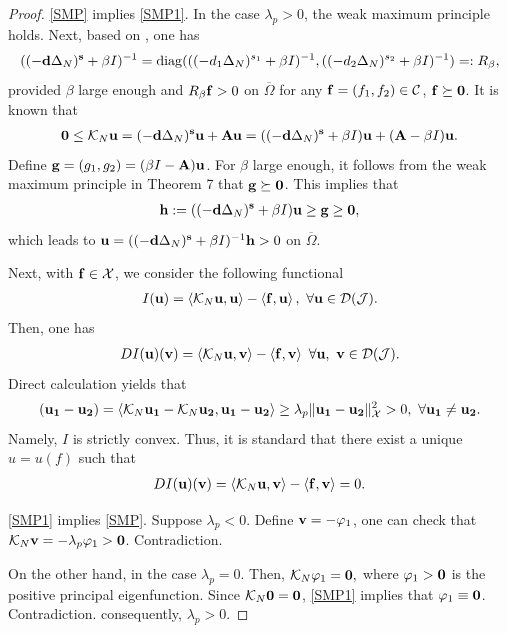 \documentclass[a4paper,11pt]{amsart}
\theoremstyle{definition}
\def\O{\Omega}
\numberwithin{equation}{section}
\theoremstyle{definition}
\def\O{\Omega}
\begin{document}
\begin{proof}  \ref{SMP} implies \ref{SMP1}. In the case $\lambda_p>0$, the weak maximum principle holds. Next, based on \cite[Theorem 3.1, Step 3, Case 1]{zhao_spatiotemporal_2025},   one has
\begin{align*}
((-{\bf d}\Delta_N)^{\bf s}+\beta I)^{-1}=\mathrm{diag}(((-d_1\Delta_N)^{s_1}+\beta I)^{-1},((-d_2\Delta_N)^{s_2}+\beta I)^{-1}) =:R_\beta, 
\end{align*}
provided $\beta$ large enough and $R_\beta{\bf f}>0$ on $\overline{\O}$ for any ${\bf f}=(f_1,f_2)\in \mathcal{C}$, ${\bf f}\succeq {\bf 0}$. It is known that
\begin{align*}
 {\bf 0}\leq \mathcal{K}_N{\bf u}= (-{\bf d}\Delta_N)^{\bf s}{\bf u} +{\bf A}{\bf u}=((-{\bf d}\Delta_N)^{\bf s}+\beta I){\bf u} +({\bf A}-\beta I){\bf u}.
\end{align*}
Define ${\bf g}=(g_1,g_2)=(\beta I-{\bf A}){\bf u}$. For $\beta$ large enough, it follows from the weak maximum principle in Theorem 7 that ${\bf g}\succeq {\bf 0}$. This implies that
\begin{align*}
{\bf h}:=((-{\bf d}\Delta_N)^{\bf s}+\beta I){\bf u}  \geq {\bf g}\geq {\bf 0},
\end{align*}
which leads to ${\bf u}=((-{\bf d}\Delta_N)^{\bf s}+\beta I)^{-1}{\bf h}>0$ on $\overline{\O}$.

Next, with ${\bf f}\in \mathcal{X}$, we consider the following functional 
\begin{align*}
I({\bf u})=\left<\mathcal{K}_N{\bf u},{\bf u}\right>-\left<{\bf f},{\bf u}\right>,~\forall {\bf u} \in \mathcal{D}(\mathcal{J}).
\end{align*}
Then, one has
\begin{align*}
DI({\bf u})({\bf v})=\left<\mathcal{K}_N{\bf u},{\bf v}\right>-\left<{\bf f},{\bf v}\right>~\forall {\bf u},~{\bf v} \in \mathcal{D}(\mathcal{J}).
\end{align*}
Direct calculation yields that
\begin{align*}
[DI({\bf u_1})-DI({\bf u_2})]({\bf u_1}-{\bf u_2})=\left<\mathcal{K}_N{\bf u_1}-\mathcal{K}_N{\bf u_2},{\bf u_1}-{\bf u_2}\right>\geq \lambda_p\|{\bf u_1}-{\bf u_2}\|_{\mathcal{X}}^2>0,~\forall {\bf u_1}\neq {\bf u_2}.
\end{align*}
Namely, $I$ is strictly convex. Thus, it is standard that there exist a unique $u=u(f)$ such that 
\begin{align*}
DI({\bf u})({\bf v})=\left<\mathcal{K}_N{\bf u},{\bf v}\right>-\left<{\bf f},{\bf v}\right>=0.
\end{align*}


 \ref{SMP1} implies \ref{SMP}. Suppose $\lambda_p<0$. Define ${\bf v}=-\varphi_1$, one can check that $\mathcal{K}_N{\bf v}=-\lambda_p\varphi_1>{\bf 0}$. Contradiction.

On the other hand, in the case $\lambda_p=0$. Then, $\mathcal{K}_N\varphi_1={\bf 0},$ where $\varphi_1>{\bf 0}$ is the positive principal eigenfunction. Since $\mathcal{K}_N{\bf 0}={\bf 0}$,  \ref{SMP1} implies that  $\varphi_1\equiv {\bf 0}$. Contradiction. consequently, $\lambda_p>0$.


\end{proof}
\end{document}
